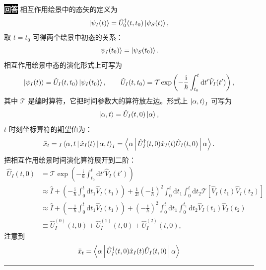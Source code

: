 \documentclass[11pt,a4paper]{ctexart}
\newenvironment{answer}
  {\par\smallskip\noindent
   \begingroup
   \setlength{\fboxsep}{4pt}%
   \colorbox{black}{\textcolor{white}{\bfseries 回答}}%
   \endgroup
   \quad\ignorespaces}
  {\par\smallskip\noindent\rule{\linewidth}{0.4pt}\medskip}
\begin{document}
\begin{answer}
  相互作用绘景中的态矢的定义为
  \begin{equation}
    \Ket{\psi_I(t) }
    =\hat{U}_0^\dag(t,t_0) \Ket{\psi_S(t) },
  \end{equation}
  取 $t=t_0 $ 可得两个绘景中初态的关系：
  \begin{equation}
    \Ket{\psi_I(t_0) }
    =\Ket{\psi_S(t_0) }.
  \end{equation}
  相互作用绘景中态的演化形式上可写为
  \begin{equation}
    \Ket{\psi_I(t) }
    =\hat{U}_I(t,t_0) \Ket{\psi_I(t_0) },\qquad
    \hat{U}_I(t,t_0)
    =\mathcal{T}\exp\left(-\frac{\mathrm{i} }{\hbar }\int_{t_0}^{t}\mathrm{d}t' \hat{V}_I(t') \right),
  \end{equation}
  其中 $\mathcal{T} $ 是编时算符，它把时间参数大的算符放左边。形式上 $\Ket{\alpha,t }_I $ 可写为
  \begin{equation}
    \Ket{\alpha,t }
    =\hat{U}_I(t,0) \Ket{\alpha },
  \end{equation}
  $t $ 时刻坐标算符的期望值为：
  \begin{equation}
    \bar{x}_t
    ={}_I\Braket{\alpha,t|\hat{x}_I(t)|\alpha,t }_I
    =\Braket{\alpha|\hat{U}_I^\dag(t,0)\hat{x}_I(t)\hat{U}_I(t,0)|\alpha }.
  \end{equation}
  把相互作用绘景时间演化算符展开到二阶：
  \begin{equation}
    \begin{aligned}
      \hat{U}_I(t,0)
      &=\mathcal{T}\exp\left(-\frac{\mathrm{i} }{\hbar }\int_{t_0}^{t}\mathrm{d}t' \hat{V}_I(t') \right) \\
      &\approx \hat{I} + \left(-\frac{\mathrm{i} }{\hbar } \int_{0}^{t}\mathrm{d}t_1 \hat{V}_I(t_1)  \right) + \frac{1 }{2! } \left(-\frac{\mathrm{i} }{\hbar }  \right)^2 \int_{0}^{t}\mathrm{d}t_1\int_{0}^{t}\mathrm{d}t_2 \mathcal{T} \left[\hat{V}_I(t_1)\hat{V}_I(t_2) \right] \\
      &\approx \hat{I} + \left(-\frac{\mathrm{i} }{\hbar } \int_{0}^{t}\mathrm{d}t_1 \hat{V}_I(t_1)  \right) +  \left(-\frac{\mathrm{i} }{\hbar }  \right)^2 \int_{0}^{t}\mathrm{d}t_1\int_{0}^{t_1}\mathrm{d}t_2 \hat{V}_I(t_1)\hat{V}_I(t_2) \\
      &\equiv \hat{U}_I^{(0)}(t,0) + \hat{U}_I^{(1)}(t,0) + \hat{U}_I^{(2)}(t,0),
    \end{aligned}
  \end{equation}
  注意到
  \begin{equation}
    \begin{aligned}
      \bar{x}_t
      &=\Braket{\alpha|\hat{U}_I^\dag(t,0)\hat{x}_I(t)\hat{U}_I(t,0)|\alpha } \\

\end{aligned}
\end{equation}
\end{answer}
\end{document}
